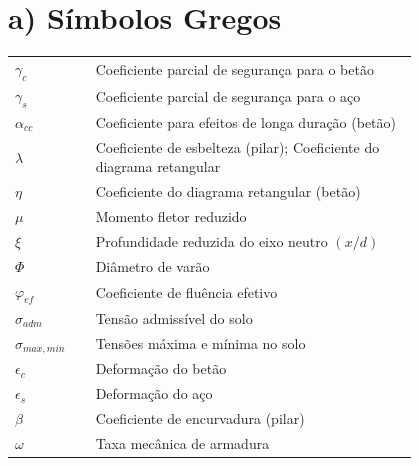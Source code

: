 \section*{a) Símbolos Gregos}
    \begin{flushleft}
        \begin{tabular}{l p{0.8\linewidth}}
        $\gamma_{c}$ & Coeficiente parcial de segurança para o betão \\
        $\gamma_{s}$ & Coeficiente parcial de segurança para o aço \\
        $\alpha_{cc}$ & Coeficiente para efeitos de longa duração (betão) \\
        $\lambda$ & Coeficiente de esbelteza (pilar); Coeficiente do diagrama retangular \\
        $\eta$ & Coeficiente do diagrama retangular (betão) \\
        $\mu$ & Momento fletor reduzido \\
        $\xi$ & Profundidade reduzida do eixo neutro $(x/d)$ \\
        $\Phi$ & Diâmetro de varão \\
        $\varphi_{ef}$ & Coeficiente de fluência efetivo \\
        $\sigma_{adm}$ & Tensão admissível do solo \\
        $\sigma_{max, min}$ & Tensões máxima e mínima no solo \\
        $\epsilon_{c}$ & Deformação do betão \\
        $\epsilon_{s}$ & Deformação do aço \\
        $\beta$ & Coeficiente de encurvadura (pilar) \\
        $\omega$ & Taxa mecânica de armadura \\
        \end{tabular}
    \end{flushleft}
    
